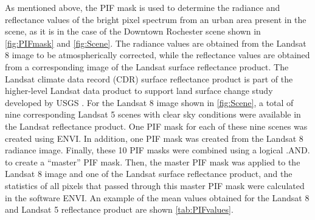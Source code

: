 \documentclass[]{spie}  %
\begin{document}
As mentioned above, the PIF mask is used to determine the radiance and reflectance values of the bright pixel spectrum from an urban area present in the scene, as it is in the case of the Downtown Rochester scene shown in \autoref{fig:PIFmask} and \autoref{fig:Scene}.  The radiance values are obtained from the Landsat 8 image to be atmospherically corrected, while the reflectance values are obtained from a corresponding image of the Landsat surface reflectance product. The Landsat climate data record (CDR) surface reflectance product is part of the higher-level Landsat data product to support land surface change study developed by USGS \cite{LandsatCDR}. For the Landsat 8 image shown in \autoref{fig:Scene}, a total of nine corresponding Landsat 5 scenes with clear sky conditions were available in the Landsat reflectance product. One PIF mask for each of these nine scenes was created using ENVI\cite{ENVIUserGuide}. In addition, one PIF mask was created from the Landsat 8 radiance image. Finally, these 10 PIF masks were combined using a logical .AND. to create a ``master'' PIF mask. Then, the master PIF mask was applied to the Landsat 8 image and one of the Landsat surface reflectance product, and the statistics of all pixels that passed through this master PIF mask were calculated in the software ENVI. An example of the mean values obtained for the Landsat 8 and Landsat 5 reflectance product are shown \autoref{tab:PIFvalues}. 
\end{document}
